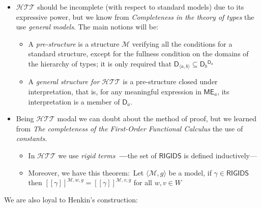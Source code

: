 \begin{itemize}
\item $\mathcal{HTT}$ should be incomplete (with respect to standard models)
due to its expressive power, but we know from \emph{Completeness in the
theory of types} the use \emph{general models}. The main notions will be:

\begin{itemize}
\item A \emph{pre-structure} is a structure $\mathcal{M}$
verifying all the conditions for a standard structure, except for the
fullness condition on the domains of the hierarchy of types; it is only
required that $\mathsf{D}_{\langle a,b\rangle }\subseteq 
\mathsf{D}_{b}{}^{\mathsf{D}_{a}}$

\item A \emph{general structure for} $\mathcal{HTT}$ is a
pre-structure closed under interpretation, that is, for any meaningful
expression in $\mathsf{ME}_{a}$, its interpretation is a member of 
$\mathsf{D}_{a}$.
\end{itemize}

\item Being $\mathcal{HTT}$ modal we can doubt about the method of proof,
but we learned from \emph{The completeness of the First-Order Functional
Calculus} the use of \emph{constants}.

\begin{itemize}
\item In $\mathcal{HTT}$ we use \emph{rigid terms}\textbf{\ ---}the set of 
$\mathsf{RIGIDS}$ is defined inductively---

\item Moreover, we have this theorem:\ 
Let $\langle \mathcal{M},g\rangle $ be a model, if $\gamma \in \mathsf{RIGIDS}$ then $[[\gamma]]^{\mathcal{M},w,g}=[[\gamma ]]^{\mathcal{M},v,g}$ for all $w,v\in W$
\end{itemize}
\end{itemize}

We are also loyal to Henkin's construction:

